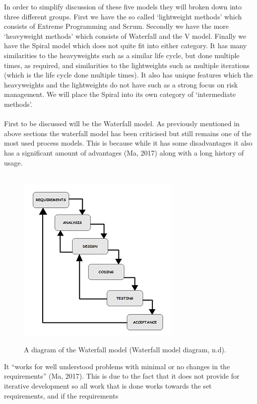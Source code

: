 \documentclass{CRPITStyle}
\begin{document}
		In order to simplify discussion of these five models they will broken down into three different groups. First we have the so called `lightweight
		methods' which consists of Extreme Programming and Scrum. Secondly we have the more `heavyweight methods' which consists of Waterfall and the V model. Finally
		we have the Spiral model which does not quite fit into either category. It has many similarities to the heavyweights such as a similar life cycle, but
		done multiple times, as required, and similarities to the lightweights such as multiple iterations (which is the life cycle done multiple times). It also
		has unique features which the heavyweights and the lightweights do not have such as a strong focus on risk management. We will place the
		Spiral into its own category of `intermediate methods'.\\
		~\\
		First to be discussed will be the Waterfall model. As previously mentioned in above sections the waterfall model has been criticised
		but still remains one of the most used process models.
		This is because while it has some disadvantages it also has a significant amount of advantages (Ma, 2017) along with a long history of usage.\\
		~\\
		\begin{figure}
		\includegraphics{waterfall2}
		~\\
		\caption{\protect\label{waterfall} A diagram of the Waterfall model (Waterfall model diagram, n.d).}
		\end{figure}
		It ``works for well understood problems with minimal or no changes in the requirements'' (Ma, 2017). This is due to the fact that
		it does not provide for iterative development so all work that is done works towards the set requirements, and if the requirements
\end{document}
